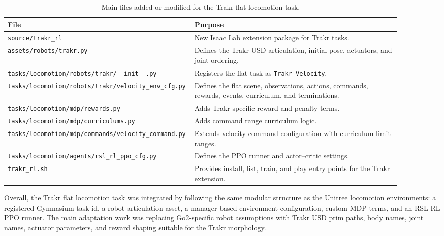 \begin{table}[h]
    \centering
    \caption{Main files added or modified for the Trakr flat locomotion task.}
    \begin{tabular}{p{0.38\linewidth} p{0.52\linewidth}}
        \hline
        \textbf{File} & \textbf{Purpose} \\
        \hline
        \texttt{source/trakr\_rl} & New Isaac Lab extension package for Trakr tasks. \\
        \texttt{assets/robots/trakr.py} & Defines the Trakr USD articulation, initial pose, actuators, and joint ordering. \\
        \texttt{tasks/locomotion/robots/trakr/\_\_init\_\_.py} & Registers the flat task as \texttt{Trakr-Velocity}. \\
        \texttt{tasks/locomotion/robots/trakr/velocity\_env\_cfg.py} & Defines the flat scene, observations, actions, commands, rewards, events, curriculum, and terminations. \\
        \texttt{tasks/locomotion/mdp/rewards.py} & Adds Trakr-specific reward and penalty terms. \\
        \texttt{tasks/locomotion/mdp/curriculums.py} & Adds command range curriculum logic. \\
        \texttt{tasks/locomotion/mdp/commands/velocity\_command.py} & Extends velocity command configuration with curriculum limit ranges. \\
        \texttt{tasks/locomotion/agents/rsl\_rl\_ppo\_cfg.py} & Defines the PPO runner and actor--critic settings. \\
        \texttt{trakr\_rl.sh} & Provides install, list, train, and play entry points for the Trakr extension. \\
        \hline
    \end{tabular}
    \label{tab:trakr_flat_task_files}
\end{table}

Overall, the Trakr flat locomotion task was integrated by following the same modular structure as the
Unitree locomotion environments: a registered Gymnasium task id, a robot articulation asset, a
manager-based environment configuration, custom MDP terms, and an RSL-RL PPO runner. The main adaptation
work was replacing Go2-specific robot assumptions with Trakr USD prim paths, body names, joint names,
actuator parameters, and reward shaping suitable for the Trakr morphology.
